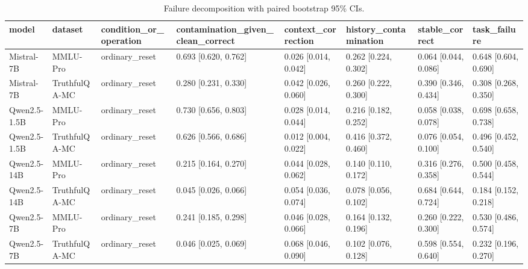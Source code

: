 \begin{table}
\caption{Failure decomposition with paired bootstrap 95\% CIs.}
\label{tab:failure-decomposition-ci}
\begin{tabular}{llllllll}
\toprule
model & dataset & condition\_or\_operation & contamination\_given\_clean\_correct & context\_correction & history\_contamination & stable\_correct & task\_failure \\
\midrule
Mistral-7B & MMLU-Pro & ordinary\_reset & 0.693 [0.620, 0.762] & 0.026 [0.014, 0.042] & 0.262 [0.224, 0.302] & 0.064 [0.044, 0.086] & 0.648 [0.604, 0.690] \\
Mistral-7B & TruthfulQA-MC & ordinary\_reset & 0.280 [0.231, 0.330] & 0.042 [0.026, 0.060] & 0.260 [0.222, 0.300] & 0.390 [0.346, 0.434] & 0.308 [0.268, 0.350] \\
Qwen2.5-1.5B & MMLU-Pro & ordinary\_reset & 0.730 [0.656, 0.803] & 0.028 [0.014, 0.044] & 0.216 [0.182, 0.252] & 0.058 [0.038, 0.078] & 0.698 [0.658, 0.738] \\
Qwen2.5-1.5B & TruthfulQA-MC & ordinary\_reset & 0.626 [0.566, 0.686] & 0.012 [0.004, 0.022] & 0.416 [0.372, 0.460] & 0.076 [0.054, 0.100] & 0.496 [0.452, 0.540] \\
Qwen2.5-14B & MMLU-Pro & ordinary\_reset & 0.215 [0.164, 0.270] & 0.044 [0.028, 0.062] & 0.140 [0.110, 0.172] & 0.316 [0.276, 0.358] & 0.500 [0.458, 0.544] \\
Qwen2.5-14B & TruthfulQA-MC & ordinary\_reset & 0.045 [0.026, 0.066] & 0.054 [0.036, 0.074] & 0.078 [0.056, 0.102] & 0.684 [0.644, 0.724] & 0.184 [0.152, 0.218] \\
Qwen2.5-7B & MMLU-Pro & ordinary\_reset & 0.241 [0.185, 0.298] & 0.046 [0.028, 0.066] & 0.164 [0.132, 0.196] & 0.260 [0.222, 0.300] & 0.530 [0.486, 0.574] \\
Qwen2.5-7B & TruthfulQA-MC & ordinary\_reset & 0.046 [0.025, 0.069] & 0.068 [0.046, 0.090] & 0.102 [0.076, 0.128] & 0.598 [0.554, 0.640] & 0.232 [0.196, 0.270] \\
\bottomrule
\end{tabular}
\end{table}
